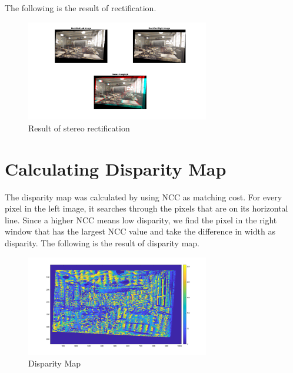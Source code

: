 The following is the result of rectification.
\begin{figure}[h]
    \centering
    \includegraphics[width=8cm]{rectified.png}
    \caption{Result of stereo rectification}
    \label{fig:result1}
\end{figure}

\section*{Calculating Disparity Map}
The disparity map was calculated by using NCC as matching cost. For every pixel in the left image, it searches through the pixels that are on its horizontal line. Since a higher NCC means low disparity, we find the pixel in the right window that has the largest NCC value and take the difference in width as disparity. The following is the result of disparity map.

\begin{figure}[h]
    \centering
    \includegraphics[width=8cm]{disparity.png}
    \caption{Disparity Map}
    \label{fig:result1}
\end{figure}


